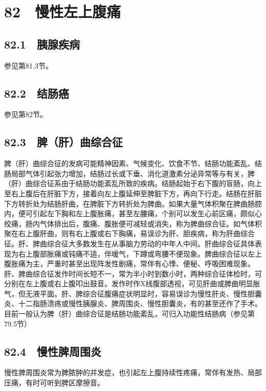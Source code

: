 \protect\hypertarget{text00205.html}{}{}

\section{82　慢性左上腹痛}

\subsection{82.1　胰腺疾病}

参见第81.3节。

\subsection{82.2　结肠癌}

参见第82节。

\subsection{82.3　脾（肝）曲综合征}

脾（肝）曲综合征的发病可能精神因素、气候变化、饮食不节、结肠功能紊乱、结肠局部气体引起张力增加，结肠过长或下垂、消化道激素分泌异常等与有关，脾（肝）曲综合征系由于结肠功能紊乱所致的疾病。结肠起始于右下腹的盲肠，向上至右上腹后在肝脏下方，接着向左上腹延伸至脾脏下方，再向下行走。结肠在肝脏下方转折处为结肠肝曲，在脾脏下方转折处为脾曲。如果大量气体积聚在脾曲肠腔内，便可引起左下胸和左上腹胀痛，甚至左腰痛，个别可以发生心前区痛，颇似心绞痛，肠内气体排出后，腹痛、腹胀便可减轻或消失，称为脾曲综合征。如气体积聚在右上腹肝曲，则有右上腹或右下胸痛，易误诊为肝、胆疾病，称为肝曲综合征。肝、脾曲综合征大多数发生在从事脑力劳动的中年人中间。肝曲综合征具体表现为右上腹部胀痛或钝痛不适，伴嗳气，下蹲或弯腰不便现象。脾曲综合征以左上腹胀痛为主，严重时甚至出现阵发性剧痛，常伴有心悸、便秘、呼吸困难现象。肝、脾曲综合征发作时间长短不一，常为半小时到数小时，两种综合征体检时，可分别在左上腹或右上腹叩出鼓音。发作时作X线腹部透视，可见肝曲或脾曲明显胀气，但无液平面。肝、脾综合征腹痛症状明显时，容易误诊为慢性肝炎、慢性胆囊炎、十二指肠溃疡或慢性胰腺炎、脾周围炎、慢性胆囊炎，有的甚至还作了手术。目前一般认为脾（肝）曲综合征是结肠功能紊乱，可归入功能性结肠病（参见第79.5节）

\subsection{82.4　慢性脾周围炎}

慢性脾周围炎常为脾脓肿的并发症，也引起左上腹持续性疼痛，常伴有发热、局部压痛，有时可听到脾区摩擦音。

